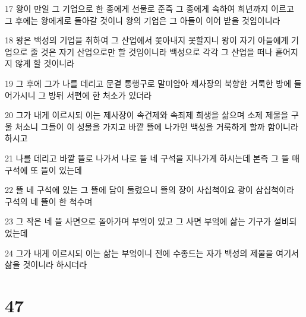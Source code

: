 \par 17 왕이 만일 그 기업으로 한 종에게 선물로 준즉 그 종에게 속하여 희년까지 이르고 그 후에는 왕에게로 돌아갈 것이니 왕의 기업은 그 아들이 이어 받을 것임이니라
\par 18 왕은 백성의 기업을 취하여 그 산업에서 쫓아내지 못할지니 왕이 자기 아들에게 기업으로 줄 것은 자기 산업으로만 할 것임이니라 백성으로 각각 그 산업을 떠나 흩어지지 않게 할 것이니라
\par 19 그 후에 그가 나를 데리고 문곁 통행구로 말미암아 제사장의 북향한 거룩한 방에 들어가시니 그 방뒤 서편에 한 처소가 있더라
\par 20 그가 내게 이르시되 이는 제사장이 속건제와 속죄제 희생을 삶으며 소제 제물을 구울 처소니 그들이 이 성물을 가지고 바깥 뜰에 나가면 백성을 거룩하게 할까 함이니라 하시고
\par 21 나를 데리고 바깥 뜰로 나가서 나로 뜰 네 구석을 지나가게 하시는데 본즉 그 뜰 매 구석에 또 뜰이 있는데
\par 22 뜰 네 구석에 있는 그 뜰에 담이 둘렸으니 뜰의 장이 사십척이요 광이 삼십척이라 구석의 네 뜰이 한 척수며
\par 23 그 작은 네 뜰 사면으로 돌아가며 부엌이 있고 그 사면 부엌에 삶는 기구가 설비되었는데
\par 24 그가 내게 이르시되 이는 삶는 부엌이니 전에 수종드는 자가 백성의 제물을 여기서 삶을 것이니라 하시더라

\chapter{47}

